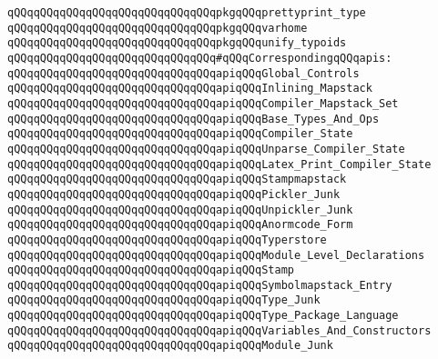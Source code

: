 \verb|qQQqqQQqqQQqqQQqqQQqqQQqqQQqqQQqpkgqQQqprettyprint_type|\newline
\verb|qQQqqQQqqQQqqQQqqQQqqQQqqQQqqQQqpkgqQQqvarhome|\newline
\verb|qQQqqQQqqQQqqQQqqQQqqQQqqQQqqQQqpkgqQQqunify_typoids|\newline
\newline
\verb|qQQqqQQqqQQqqQQqqQQqqQQqqQQqqQQq#qQQqCorrespondingqQQqapis:|\newline
\verb|qQQqqQQqqQQqqQQqqQQqqQQqqQQqqQQqapiqQQqGlobal_Controls|\newline
\verb|qQQqqQQqqQQqqQQqqQQqqQQqqQQqqQQqapiqQQqInlining_Mapstack|\newline
\verb|qQQqqQQqqQQqqQQqqQQqqQQqqQQqqQQqapiqQQqCompiler_Mapstack_Set|\newline
\verb|qQQqqQQqqQQqqQQqqQQqqQQqqQQqqQQqapiqQQqBase_Types_And_Ops|\newline
\verb|qQQqqQQqqQQqqQQqqQQqqQQqqQQqqQQqapiqQQqCompiler_State|\newline
\verb|qQQqqQQqqQQqqQQqqQQqqQQqqQQqqQQqapiqQQqUnparse_Compiler_State|\newline
\verb|qQQqqQQqqQQqqQQqqQQqqQQqqQQqqQQqapiqQQqLatex_Print_Compiler_State|\newline
\verb|qQQqqQQqqQQqqQQqqQQqqQQqqQQqqQQqapiqQQqStampmapstack|\newline
\verb|qQQqqQQqqQQqqQQqqQQqqQQqqQQqqQQqapiqQQqPickler_Junk|\newline
\verb|qQQqqQQqqQQqqQQqqQQqqQQqqQQqqQQqapiqQQqUnpickler_Junk|\newline
\verb|qQQqqQQqqQQqqQQqqQQqqQQqqQQqqQQqapiqQQqAnormcode_Form|\newline
\newline
\verb|qQQqqQQqqQQqqQQqqQQqqQQqqQQqqQQqapiqQQqTyperstore|\newline
\verb|qQQqqQQqqQQqqQQqqQQqqQQqqQQqqQQqapiqQQqModule_Level_Declarations|\newline
\verb|qQQqqQQqqQQqqQQqqQQqqQQqqQQqqQQqapiqQQqStamp|\newline
\verb|qQQqqQQqqQQqqQQqqQQqqQQqqQQqqQQqapiqQQqSymbolmapstack_Entry|\newline
\verb|qQQqqQQqqQQqqQQqqQQqqQQqqQQqqQQqapiqQQqType_Junk|\newline
\verb|qQQqqQQqqQQqqQQqqQQqqQQqqQQqqQQqapiqQQqType_Package_Language|\newline
\verb|qQQqqQQqqQQqqQQqqQQqqQQqqQQqqQQqapiqQQqVariables_And_Constructors|\newline
\verb|qQQqqQQqqQQqqQQqqQQqqQQqqQQqqQQqapiqQQqModule_Junk|\newline
